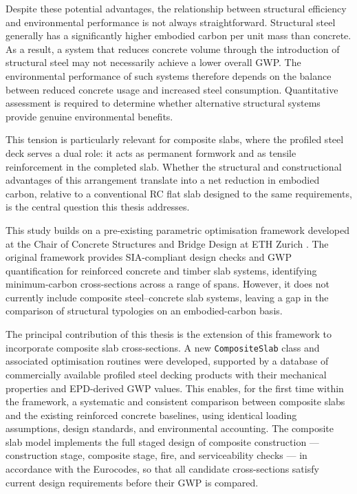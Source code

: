 Despite these potential advantages, the relationship between structural efficiency and environmental performance is not always straightforward. Structural steel generally has a significantly higher embodied carbon per unit mass than concrete. As a result, a system that reduces concrete volume through the introduction of structural steel may not necessarily achieve a lower overall GWP. The environmental performance of such systems therefore depends on the balance between reduced concrete usage and increased steel consumption. Quantitative assessment is required to determine whether alternative structural systems provide genuine environmental benefits.

This tension is particularly relevant for composite slabs, where the profiled steel deck serves a dual role: it acts as permanent formwork and as tensile reinforcement in the completed slab. Whether the structural and constructional advantages of this arrangement translate into a net reduction in embodied carbon, relative to a conventional RC flat slab designed to the same requirements, is the central question this thesis addresses.

This study builds on a pre-existing parametric optimisation framework developed at the Chair of Concrete Structures and Bridge Design at ETH Zurich . The original framework provides SIA-compliant design checks and GWP quantification for reinforced concrete and timber slab systems, identifying minimum-carbon cross-sections across a range of spans. However, it does not currently include composite steel--concrete slab systems, leaving a gap in the comparison of structural typologies on an embodied-carbon basis.

The principal contribution of this thesis is the extension of this framework to incorporate composite slab cross-sections. A new \texttt{CompositeSlab} class and associated optimisation routines were developed, supported by a database of commercially available profiled steel decking products with their mechanical properties and EPD-derived GWP values. This enables, for the first time within the framework, a systematic and consistent comparison between composite slabs and the existing reinforced concrete baselines, using identical loading assumptions, design standards, and environmental accounting. The composite slab model implements the full staged design of composite construction --- construction stage, composite stage, fire, and serviceability checks --- in accordance with the Eurocodes, so that all candidate cross-sections satisfy current design requirements before their GWP is compared.

